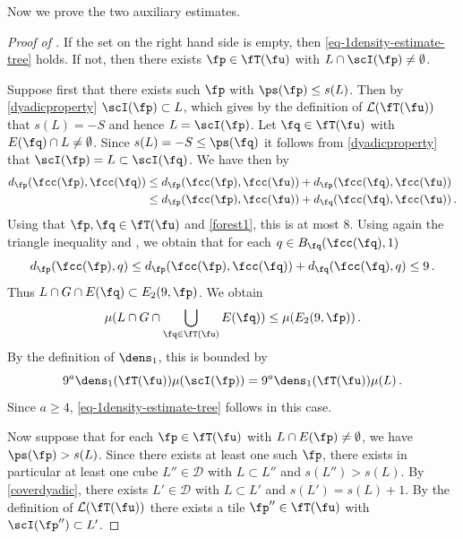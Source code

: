 Now we prove the two auxiliary estimates.

\begin{proof}[Proof of ]
    \leanok
    If the set on the right hand side is empty, then \eqref{eq-1density-estimate-tree} holds. If not, then there exists $\fp \in \fT(\fu)$ with $L \cap \scI(\fp) \ne \emptyset$.

    Suppose first that there exists such $\fp$ with $\ps(\fp) \le s(L)$. Then by \eqref{dyadicproperty} $\scI(\fp) \subset L$, which gives by the definition of $\mathcal{L}(\fT(\fu))$ that $s(L) = -S$ and hence $L = \scI(\fp)$. Let $\fq \in \fT(\fu)$ with $E(\fq) \cap L \ne \emptyset$. Since $s(L) = -S \le \ps(\fq)$ it follows from \eqref{dyadicproperty} that $\scI(\fp) = L \subset \scI(\fq)$. We have then by 
    \begin{align*}
        d_{\fp}(\fcc(\fp), \fcc(\fq)) &\le d_{\fp}(\fcc(\fp), \fcc(\fu)) + d_{\fp}(\fcc(\fq), \fcc(\fu))\\
        &\le d_{\fp}(\fcc(\fp), \fcc(\fu)) + d_{\fq}(\fcc(\fq), \fcc(\fu))\,.
    \end{align*}
    Using that $\fp, \fq \in \fT(\fu)$ and \eqref{forest1}, this is at most $8$. Using again the triangle inequality and , we obtain that for each $q \in B_{\fq}(\fcc(\fq), 1)$
    $$
        d_{\fp}(\fcc(\fp), q) \le d_{\fp}(\fcc(\fp), \fcc(\fq)) + d_{\fq}(\fcc(\fq), q) \le 9\,.
    $$
    Thus $L \cap G \cap E(\fq) \subset E_2(9, \fp)$. We obtain
    $$
        \mu(L \cap G \cap \bigcup_{\fq \in \fT(\fu)} E(\fq)) \le \mu(E_2(9, \fp))\,.
    $$
    By the definition of $\dens_1$, this is bounded by
    $$
        9^a \dens_1(\fT(\fu)) \mu(\scI(\fp)) =9^a \dens_1(\fT(\fu)) \mu(L)\,.
    $$
    Since $a \ge 4$, \eqref{eq-1density-estimate-tree} follows in this case.

    Now suppose that for each $\fp \in \fT(\fu)$ with $L \cap E(\fp) \ne \emptyset$, we have $\ps(\fp) > s(L)$.
    Since there exists at least one such $\fp$, there exists in particular at least one cube $L'' \in \mathcal{D}$ with $L \subset L''$ and $s(L'') > s(L)$.
    By \eqref{coverdyadic}, there exists $L' \in \mathcal{D}$ with $L \subset L'$ and $s(L') = s(L) + 1$.
    By the definition of $\mathcal{L}(\fT(\fu))$ there exists a tile $\fp'' \in \fT(\fu)$ with $\scI(\fp'') \subset L'$.


\end{proof}
